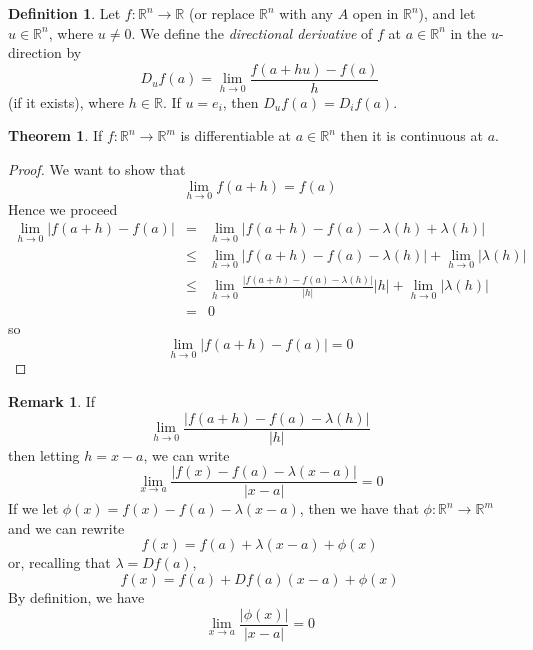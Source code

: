\documentclass[a4paper,14pt]{extarticle}
\theoremstyle{definition}
\newtheorem*{theorem}{Theorem}
\newtheorem*{definition}{Definition}
\newtheorem*{remark}{Remark}
\begin{document}
\begin{definition}
	Let $f:\mathbb{R}^n\rightarrow\mathbb{R}$ (or replace $\mathbb{R}^n$ with any $A$ open in $\mathbb{R}^n$), and let $u\in\mathbb{R}^n$, where $u\neq0$. We define the
	\emph{directional derivative} of $f$ at $a\in\mathbb{R}^n$ in the $u$-direction by
	\[D_uf(a)=\lim\limits_{h\to0}\frac{f(a+hu)-f(a)}{h}\] (if it exists), where $h\in\mathbb{R}$. If $u=e_i$, then $D_uf(a)=D_if(a)$.
\end{definition}

\begin{theorem}
	If $f:\mathbb{R}^n\rightarrow\mathbb{R}^m$ is differentiable at $a\in\mathbb{R}^n$ then it is continuous at $a$.
\end{theorem}

\begin{proof}
	We want to show that \[\lim\limits_{h\to0}f(a+h)=f(a)\] Hence we proceed
	\begin{eqnarray*}
		\lim\limits_{h\to0}|f(a+h)-f(a)|&=&\lim\limits_{h\to0}|f(a+h)-f(a)-\lambda(h)+\lambda(h)|\\
				&\leq&\lim\limits_{h\to0}|f(a+h)-f(a)-\lambda(h)|+\lim\limits_{h\to0}|\lambda(h)|\\
				&\leq&\lim\limits_{h\to0}\frac{|f(a+h)-f(a)-\lambda(h)|}{|h|}|h|+\lim\limits_{h\to0}|\lambda(h)|\\
				&=&0
	\end{eqnarray*}
	so \[\lim\limits_{h\to0}|f(a+h)-f(a)|=0\]
\end{proof}

\begin{remark}
	If \[\lim\limits_{h\to0}\frac{|f(a+h)-f(a)-\lambda(h)|}{|h|}\] then letting $h=x-a$, we can write \[\lim\limits_{x\to a}\frac{|f(x)-f(a)-\lambda(x-a)|}{|x-a|}=0\]
	If we let $\phi(x)=f(x)-f(a)-\lambda(x-a)$, then we have that $\phi:\mathbb{R}^n\rightarrow\mathbb{R}^m$ and we can rewrite
	\[f(x)=f(a)+\lambda(x-a)+\phi(x)\] or, recalling that $\lambda=Df(a)$, \[f(x)=f(a)+Df(a)(x-a)+\phi(x)\] By definition, we have
	\[\lim\limits_{x\to a}\frac{|\phi(x)|}{|x-a|}=0\]
\end{remark}
\end{document}
